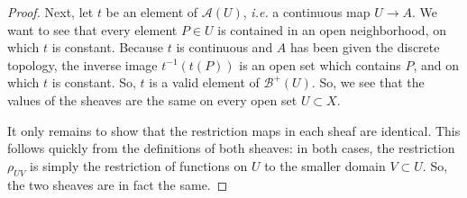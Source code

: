 \documentclass[12pt]{article}
\theoremstyle{definition}
\newenvironment{problem}[2][Problem]{\begin{trivlist}
\item[\hskip \labelsep {\bfseries #1}\hskip \labelsep {\bfseries #2.}]}{\end{trivlist}}
\begin{document}
\begin{problem}{1}
\begin{proof}
\par Next, let $t$ be an element of $\mathcal A(U)$, \textit{i.e.} a continuous map $U \to A$. We want to see that every element $P \in U$ is contained in an open neighborhood, on which $t$ is constant. Because $t$ is continuous and $A$ has been given the discrete topology, the inverse image $t^{-1}(t(P))$ is an open set which contains $P$, and on which $t$ is constant. So, $t$ is a valid element of $\mathcal B^+(U)$. So, we see that the values of the sheaves are the same on every open set $U \subset X$.
\par It only remains to show that the restriction maps in each sheaf are identical. This follows quickly from the definitions of both sheaves: in both cases, the restriction $\rho_{UV}$ is simply the restriction of functions on $U$ to the smaller domain $V \subset U$. So, the two sheaves are in fact the same.
\end{proof}
\end{problem}
\end{document}
